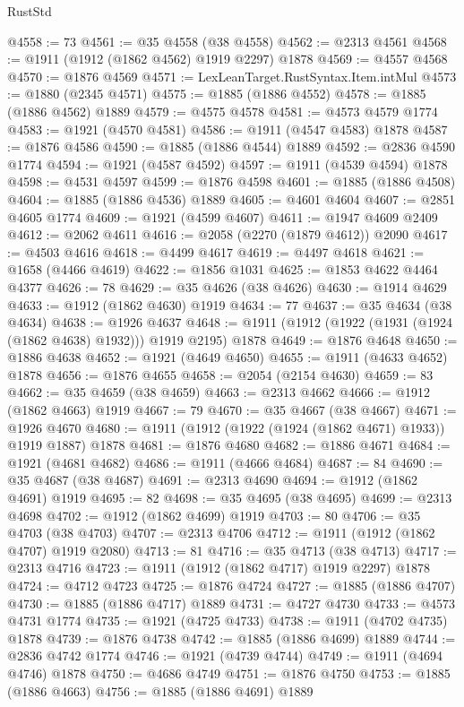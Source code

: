 \begin{lexlean}{RustStd}
\begin{coremodule}
@4558 := 73
@4561 := @35 @4558 (@38 @4558)
@4562 := @2313 @4561
@4568 := @1911 (@1912 (@1862 @4562) @1919 @2297) @1878
@4569 := @4557 @4568
@4570 := @1876 @4569
@4571 := LexLeanTarget.RustSyntax.Item.intMul
@4573 := @1880 (@2345 @4571)
@4575 := @1885 (@1886 @4552)
@4578 := @1885 (@1886 @4562) @1889
@4579 := @4575 @4578
@4581 := @4573 @4579 @1774
@4583 := @1921 (@4570 @4581)
@4586 := @1911 (@4547 @4583) @1878
@4587 := @1876 @4586
@4590 := @1885 (@1886 @4544) @1889
@4592 := @2836 @4590 @1774
@4594 := @1921 (@4587 @4592)
@4597 := @1911 (@4539 @4594) @1878
@4598 := @4531 @4597
@4599 := @1876 @4598
@4601 := @1885 (@1886 @4508)
@4604 := @1885 (@1886 @4536) @1889
@4605 := @4601 @4604
@4607 := @2851 @4605 @1774
@4609 := @1921 (@4599 @4607)
@4611 := @1947 @4609 @2409
@4612 := @2062 @4611
@4616 := @2058 (@2270 (@1879 @4612)) @2090
@4617 := @4503 @4616
@4618 := @4499 @4617
@4619 := @4497 @4618
@4621 := @1658 (@4466 @4619)
@4622 := @1856 @1031
@4625 := @1853 @4622 @4464 @4377
@4626 := 78
@4629 := @35 @4626 (@38 @4626)
@4630 := @1914 @4629
@4633 := @1912 (@1862 @4630) @1919
@4634 := 77
@4637 := @35 @4634 (@38 @4634)
@4638 := @1926 @4637
@4648 := @1911 (@1912 (@1922 (@1931 (@1924 (@1862 @4638) @1932))) @1919 @2195) @1878
@4649 := @1876 @4648
@4650 := @1886 @4638
@4652 := @1921 (@4649 @4650)
@4655 := @1911 (@4633 @4652) @1878
@4656 := @1876 @4655
@4658 := @2054 (@2154 @4630)
@4659 := 83
@4662 := @35 @4659 (@38 @4659)
@4663 := @2313 @4662
@4666 := @1912 (@1862 @4663) @1919
@4667 := 79
@4670 := @35 @4667 (@38 @4667)
@4671 := @1926 @4670
@4680 := @1911 (@1912 (@1922 (@1924 (@1862 @4671) @1933)) @1919 @1887) @1878
@4681 := @1876 @4680
@4682 := @1886 @4671
@4684 := @1921 (@4681 @4682)
@4686 := @1911 (@4666 @4684)
@4687 := 84
@4690 := @35 @4687 (@38 @4687)
@4691 := @2313 @4690
@4694 := @1912 (@1862 @4691) @1919
@4695 := 82
@4698 := @35 @4695 (@38 @4695)
@4699 := @2313 @4698
@4702 := @1912 (@1862 @4699) @1919
@4703 := 80
@4706 := @35 @4703 (@38 @4703)
@4707 := @2313 @4706
@4712 := @1911 (@1912 (@1862 @4707) @1919 @2080)
@4713 := 81
@4716 := @35 @4713 (@38 @4713)
@4717 := @2313 @4716
@4723 := @1911 (@1912 (@1862 @4717) @1919 @2297) @1878
@4724 := @4712 @4723
@4725 := @1876 @4724
@4727 := @1885 (@1886 @4707)
@4730 := @1885 (@1886 @4717) @1889
@4731 := @4727 @4730
@4733 := @4573 @4731 @1774
@4735 := @1921 (@4725 @4733)
@4738 := @1911 (@4702 @4735) @1878
@4739 := @1876 @4738
@4742 := @1885 (@1886 @4699) @1889
@4744 := @2836 @4742 @1774
@4746 := @1921 (@4739 @4744)
@4749 := @1911 (@4694 @4746) @1878
@4750 := @4686 @4749
@4751 := @1876 @4750
@4753 := @1885 (@1886 @4663)
@4756 := @1885 (@1886 @4691) @1889

\end{coremodule}
\end{lexlean}
